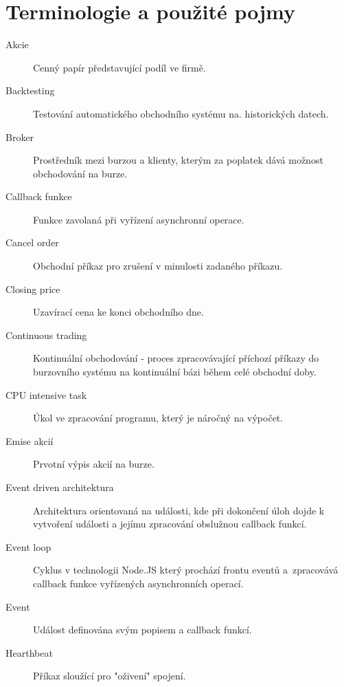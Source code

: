 \documentclass[thesis=M,czech]{FITthesis}[2012/06/26]
\begin{document}
\chapter{Terminologie a použité pojmy}
\label{chap:terminology}

\begin{description}

	\item[Akcie] Cenný papír představující podíl ve firmě.

	\item[Backtesting] Testování automatického obchodního systému na. historických datech.

	\item[Broker] Prostředník mezi burzou a klienty, kterým za poplatek dává možnost obchodování na burze.

	\item[Callback funkce] Funkce zavolaná při vyřízení asynchronní operace.

	\item[Cancel order] Obchodní příkaz pro zrušení v minulosti zadaného příkazu.

	\item[Closing price] Uzavírací cena ke konci obchodního dne.

	\item[Continuous trading] Kontinuální obchodování - proces zpracovávající příchozí příkazy do burzovního systému na kontinuální bázi během celé obchodní doby.

	\item[CPU intensive task] Úkol ve zpracování programu, který je náročný na výpočet.

	\item[Emise akcií] Prvotní výpis akcií na burze.

	\item[Event driven architektura] Architektura orientovaná na události, kde při dokončení úloh dojde k vytvoření události a jejímu zpracování obslužnou callback funkcí.

	\item[Event loop] Cyklus v technologii Node.JS který prochází frontu eventů a~zpracovává callback funkce vyřízených asynchronních operací.

	\item[Event] Událost definována svým popisem a callback funkcí.

	\item[Hearthbeat] Příkaz sloužící pro "oživení" spojení.


\end{description}
\end{document}
